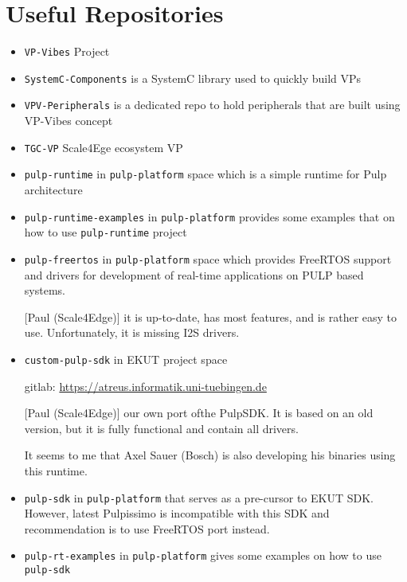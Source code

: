 \documentclass{article}
\begin{document}
\section{Useful Repositories}
\begin{itemize}
 \item \texttt{VP-Vibes} Project
 \item \texttt{SystemC-Components} is a SystemC library used to quickly build VPs
 \item \texttt{VPV-Peripherals} is a dedicated repo to hold peripherals that are built using VP-Vibes concept
 \item \texttt{TGC-VP} Scale4Ege ecosystem VP
 \item \texttt{pulp-runtime} in \texttt{pulp-platform} space which is a simple runtime for Pulp architecture
 \item \texttt{pulp-runtime-examples} in \texttt{pulp-platform} provides some examples that on how to use
       \texttt{pulp-runtime} project
 \item \texttt{pulp-freertos} in \texttt{pulp-platform} space which provides FreeRTOS support and drivers for
       development of real-time applications on PULP based systems.

        [Paul (Scale4Edge)] it is up-to-date, has most features, and is rather easy to use. Unfortunately, it is
       missing I2S drivers.
 \item \texttt{custom-pulp-sdk} in EKUT project space

       gitlab: \url{https://atreus.informatik.uni-tuebingen.de}

       [Paul (Scale4Edge)] our own port ofthe PulpSDK. It is based on an old version, but it is fully functional
       and contain all drivers.

       It seems to me that Axel Sauer (Bosch) is also developing his binaries using this runtime.
 \item \texttt{pulp-sdk} in \texttt{pulp-platform} that serves as a pre-cursor to EKUT SDK. However, latest
       Pulpissimo is incompatible with this SDK and recommendation is to use FreeRTOS port instead.
 \item \texttt{pulp-rt-examples} in \texttt{pulp-platform} gives some examples on how to use \texttt{pulp-sdk}
\end{itemize}
\end{document}
